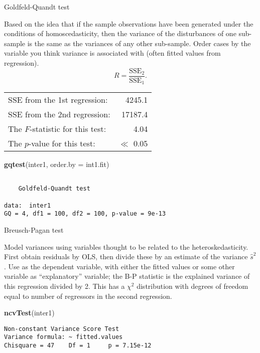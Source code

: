 \documentclass[10pt,ignorenonframetext,]{beamer}
\newenvironment{Shaded}{\begin{snugshade}}{\end{snugshade}}
\newcommand{\KeywordTok}[1]{\textcolor[rgb]{0.13,0.29,0.53}{\textbf{{#1}}}}
\newcommand{\DataTypeTok}[1]{\textcolor[rgb]{0.13,0.29,0.53}{{#1}}}
\newcommand{\NormalTok}[1]{{#1}}
\begin{document}
\begin{frame}[fragile]{Goldfeld-Quandt test}

\footnotesize
Based on the idea that if the sample observations have been generated
under the conditions of homoscedasticity, then the variance of the
disturbances of one sub-sample is the same as the variances of any other
sub-sample. Order cases by the variable you think variance is associated
with (often fitted values from regression). \[
R = \frac{\text{SSE}_2}{\text{SSE}_1}.
\]

\begin{center}
\begin{tabular}{lr}
  SSE from the 1st regression:&    4245.1\\
  SSE from the 2nd regression: &  17187.4\\
  The $F$-statistic for this test:&    4.04\\
  The $p$-value for this test:     &    $\ll$ 0.05   \\
\end{tabular}
\end{center}

\begin{Shaded}
\begin{Highlighting}[]
\KeywordTok{gqtest}\NormalTok{(inter1, }\DataTypeTok{order.by =} \NormalTok{int1.fit)}
\end{Highlighting}
\end{Shaded}

\begin{verbatim}

    Goldfeld-Quandt test

data:  inter1
GQ = 4, df1 = 100, df2 = 100, p-value = 9e-13
\end{verbatim}

\end{frame}

\begin{frame}[fragile]{Breusch-Pagan test}

Model variances using variables thought to be related to the
heteroskedasticity. First obtain residuals by OLS, then divide these by
an estimate of the variance \(\hat{s}^2\). Use as the dependent
variable, with either the fitted values or some other variable as
``explanatory'' variable; the B-P statistic is the explained variance of
this regression divided by 2. This has a \(\chi^2\) distribution with
degrees of freedom equal to number of regressors in the second
regression.

\begin{Shaded}
\begin{Highlighting}[]
\KeywordTok{ncvTest}\NormalTok{(inter1)}
\end{Highlighting}
\end{Shaded}

\begin{verbatim}
Non-constant Variance Score Test 
Variance formula: ~ fitted.values 
Chisquare = 47    Df = 1     p = 7.15e-12 
\end{verbatim}

\end{frame}
\end{document}
